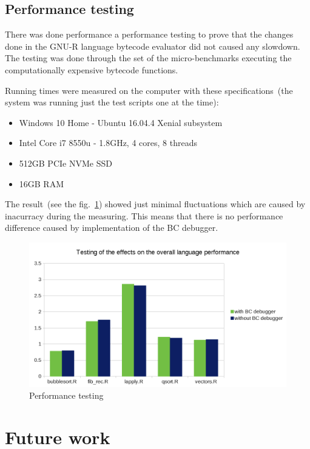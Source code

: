 \documentclass[thesis=M,english]{FITthesis}[2018/10/20]
\begin{document}
{\section{Performance testing}\label{performance-testing}

There was done performance a performance testing to prove that the changes done in the GNU-R language bytecode evaluator did not caused any slowdown. The testing was done through the set of the micro-benchmarks executing the computationally expensive bytecode functions. 

Running times were measured on the computer with these specifications~(the system was running just the test scripts one at the time):

\begin{itemize}
	\item Windows 10 Home - Ubuntu 16.04.4 Xenial subsystem
	\item Intel Core i7 8550u - 1.8GHz, 4 cores, 8 threads
	\item 512GB PCIe NVMe SSD
	\item 16GB RAM
\end{itemize}

The result~(see the fig.~\ref{fig:performance-testing}) showed just minimal fluctuations which are caused by inacurracy during the measuring. This means that there is no performance difference caused by implementation of the BC debugger.

\begin{figure}[H]\centering
	\includegraphics[width=\textwidth]{performance-testing}
	\caption{Performance testing}\label{fig:performance-testing}
\end{figure}

\chapter{Future work}\label{future-work}

}
\end{document}
